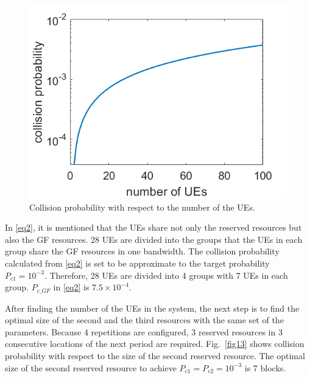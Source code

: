 \documentclass{ieeeaccess}
\begin{document}
\begin{figure}[htbp]
\centerline{\includegraphics[scale=0.35]{fig12.png}}
\caption{Collision probability with respect to the number of the UEs.}
\vspace{-2mm}
\label{fig12}

\end{figure}


In \eqref{eq2}, it is mentioned that the UEs share not only the reserved resources but also the GF resources. 28 UEs are divided into the groups that the UEs in each group share the GF resources in one bandwidth. The collision probability calculated from \eqref{eq2} is set to be approximate to the target probability $P_{c1}=10^{-3}$. Therefore, 28 UEs are divided into 4 groups with 7 UEs in each group. $P_{c\_GF}$ in \eqref{eq2} is $7.5\times10^{-4}$.


After finding the number of the UEs in the system, the next step is to find the optimal size of the second and the third resources with the same set of the parameters. Because 4 repetitions are configured, 3 reserved resources in 3 consecutive locations of the next period are required. Fig.~\ref{fig13} shows collision probability with respect to the size of the second reserved resource. The optimal size of the second reserved resource to achieve $P_{c1} = P_{c2} = 10^{-3}$ is 7 blocks.
\end{document}
